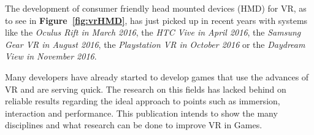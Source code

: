 The development of consumer friendly head mounted devices (HMD) for VR, as to see in \textbf{Figure~\ref{fig:vrHMD}}, has just picked up in recent years with systems like the \textit{Oculus Rift in March 2016}, the \textit{HTC Vive in April 2016}, the \textit{Samsung Gear VR in August 2016}, the \textit{Playstation VR in October 2016} or the \textit{Daydream View in November 2016}. 

Many developers have already started to develop games that use the advances of VR and are serving quick. The research on this fields has lacked behind on reliable results regarding the ideal approach to points such as immersion, interaction and performance. This publication intends to show the many disciplines and what research can be done to improve VR in Games.

